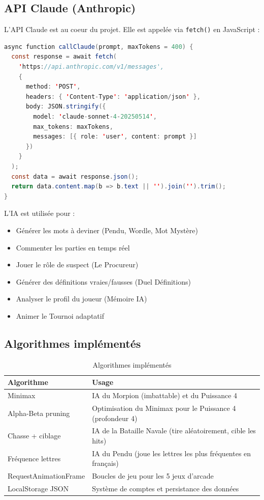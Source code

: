 \documentclass[a4paper, 12pt, twoside]{article}
\begin{document}
\subsection{API Claude (Anthropic)}

L'API Claude est au coeur du projet. Elle est appelée via \texttt{fetch()} en JavaScript :

\begin{lstlisting}[language=Java, caption=Exemple d'appel à l'API Claude]
async function callClaude(prompt, maxTokens = 400) {
  const response = await fetch(
    'https://api.anthropic.com/v1/messages',
    {
      method: 'POST',
      headers: { 'Content-Type': 'application/json' },
      body: JSON.stringify({
        model: 'claude-sonnet-4-20250514',
        max_tokens: maxTokens,
        messages: [{ role: 'user', content: prompt }]
      })
    }
  );
  const data = await response.json();
  return data.content.map(b => b.text || '').join('').trim();
}
\end{lstlisting}

L'IA est utilisée pour :
\begin{itemize}
  \item Générer les mots à deviner (Pendu, Wordle, Mot Mystère)
  \item Commenter les parties en temps réel
  \item Jouer le rôle de suspect (Le Procureur)
  \item Générer des définitions vraies/fausses (Duel Définitions)
  \item Analyser le profil du joueur (Mémoire IA)
  \item Animer le Tournoi adaptatif
\end{itemize}

\subsection{Algorithmes implémentés}

\begin{table}[H]
\centering
\begin{tabular}{|p{4cm}|p{9cm}|}
\hline
\textbf{Algorithme} & \textbf{Usage} \\
\hline
Minimax & IA du Morpion (imbattable) et du Puissance 4 \\
\hline
Alpha-Beta pruning & Optimisation du Minimax pour le Puissance 4 (profondeur 4) \\
\hline
Chasse + ciblage & IA de la Bataille Navale (tire aléatoirement, cible les hits) \\
\hline
Fréquence lettres & IA du Pendu (joue les lettres les plus fréquentes en français) \\
\hline
RequestAnimationFrame & Boucles de jeu pour les 5 jeux d'arcade \\
\hline
LocalStorage JSON & Système de comptes et persistance des données \\
\hline
\end{tabular}
\caption{Algorithmes implémentés}
\label{tab:algos}
\end{table}
\end{document}
